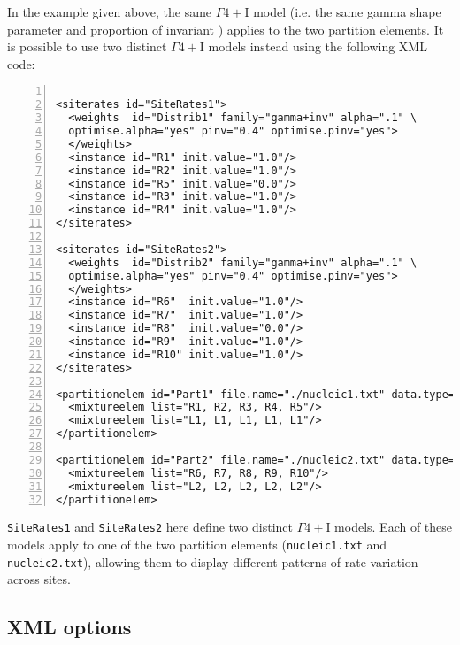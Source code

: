 \documentclass[a4paper,12pt]{article}
\newcommand{\x}[1]{\texttt{#1}}
\begin{document}
In the example given above, the same $\Gamma4+$I model (i.e. the same gamma shape parameter and
proportion of invariant ) applies to the two partition elements. It is possible to use two distinct
$\Gamma4+$I models instead using the following XML code:



\vspace{0.2cm}
\begin{Verbatim}[frame=single, label=Two distinct $\Gamma4+$I models, samepage=true,
  baselinestretch=0.5, fontsize=\small, numbers=left]

<siterates id="SiteRates1">
  <weights  id="Distrib1" family="gamma+inv" alpha=".1" \
  optimise.alpha="yes" pinv="0.4" optimise.pinv="yes">
  </weights>
  <instance id="R1" init.value="1.0"/>
  <instance id="R2" init.value="1.0"/>
  <instance id="R5" init.value="0.0"/>
  <instance id="R3" init.value="1.0"/>
  <instance id="R4" init.value="1.0"/>
</siterates>

<siterates id="SiteRates2">
  <weights  id="Distrib2" family="gamma+inv" alpha=".1" \
  optimise.alpha="yes" pinv="0.4" optimise.pinv="yes">
  </weights>
  <instance id="R6"  init.value="1.0"/>
  <instance id="R7"  init.value="1.0"/>
  <instance id="R8"  init.value="0.0"/>
  <instance id="R9"  init.value="1.0"/>
  <instance id="R10" init.value="1.0"/>
</siterates>

<partitionelem id="Part1" file.name="./nucleic1.txt" data.type="nt">
  <mixtureelem list="R1, R2, R3, R4, R5"/>
  <mixtureelem list="L1, L1, L1, L1, L1"/>
</partitionelem>

<partitionelem id="Part2" file.name="./nucleic2.txt" data.type="nt">
  <mixtureelem list="R6, R7, R8, R9, R10"/>
  <mixtureelem list="L2, L2, L2, L2, L2"/>
</partitionelem>

\end{Verbatim}

\x{SiteRates1} and \x{SiteRates2} here define two distinct $\Gamma4+$I models. Each of these models apply to
one of the two partition elements (\x{nucleic1.txt} and \x{nucleic2.txt}), allowing them to display
different patterns of rate variation across sites.


\subsection{XML options}
\end{document}
